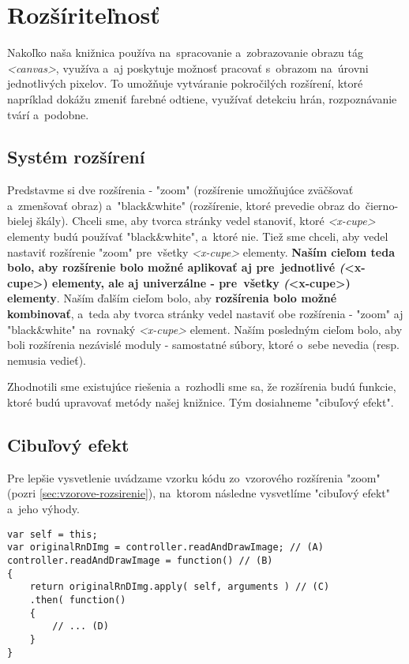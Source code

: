 \section{Rozšíriteľnosť}

Nakoľko naša knižnica používa na~spracovanie a~zobrazovanie obrazu tág \emph{<canvas>}, využíva a~aj poskytuje možnosť pracovať s~obrazom na~úrovni jednotlivých pixelov. To umožňuje vytváranie pokročilých rozšírení, ktoré napríklad dokážu zmeniť farebné odtiene, využívať detekciu hrán, rozpoznávanie tvárí a~podobne.

\subsection{Systém rozšírení}
\label{sec:system-rozsireni}

Predstavme si dve rozšírenia - "zoom" (rozšírenie umožňujúce zväčšovať a~zmenšovať obraz) a~"black\&white" (rozšírenie, ktoré prevedie obraz do~čierno-bielej škály). Chceli sme, aby tvorca stránky vedel stanoviť, ktoré \emph{<x-cupe>} elementy budú používať "black\&white", a~ktoré nie. Tiež sme chceli, aby vedel nastaviť rozšírenie "zoom" pre~všetky \emph{<x-cupe>} elementy. \textbf{Naším cieľom teda bolo, aby rozšírenie bolo možné aplikovať aj pre~jednotlivé \emph(<x-cupe>) elementy, ale aj univerzálne - pre~všetky \emph(<x-cupe>) elementy}. Naším ďalším cieľom bolo, aby \textbf{rozšírenia bolo možné kombinovať}, a~teda aby tvorca stránky vedel nastaviť obe rozšírenia - "zoom" aj "black\&white" na~rovnaký \emph{<x-cupe>} element. Naším posledným cieľom bolo, aby boli rozšírenia nezávislé moduly - samostatné súbory, ktoré o~sebe nevedia (resp. nemusia vedieť).

Zhodnotili sme existujúce riešenia a~rozhodli sme sa, že rozšírenia budú funkcie, ktoré budú upravovať metódy našej knižnice. Tým dosiahneme "cibuľový efekt".

\subsection{Cibuľový efekt}

Pre lepšie vysvetlenie uvádzame vzorku kódu zo~vzorového rozšírenia "zoom" (pozri \ref{sec:vzorove-rozsirenie}), na~ktorom následne vysvetlíme "cibuľový efekt" a~jeho výhody.

\begin{lstlisting}[label=vytvaranie-cibuloveho-efektu,caption=Vytváranie cibuľového efektu.]
var self = this;
var originalRnDImg = controller.readAndDrawImage; // (A)
controller.readAndDrawImage = function() // (B)
{
    return originalRnDImg.apply( self, arguments ) // (C)
    .then( function()
    {
        // ... (D)
    }
}
\end{lstlisting}

